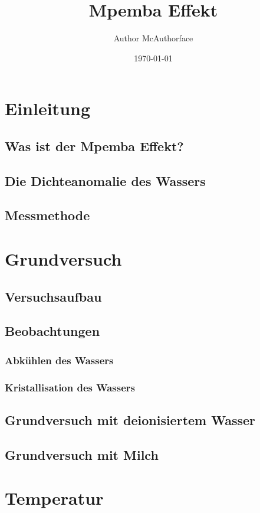 \documentclass[11pt,a4paper]{scrartcl}
\title{Mpemba Effekt}
\date{\today}
\author{Author McAuthorface}
\begin{document}
\maketitle
\thispagestyle{empty}
\newpage

\tableofcontents
\thispagestyle{empty}
\newpage

\section{Einleitung}
\subsection{Was ist der Mpemba Effekt?}
\subsection{Die Dichteanomalie des Wassers}
\subsection{Messmethode}

\section{Grundversuch}
\subsection{Versuchsaufbau}
\subsection{Beobachtungen}
\subsubsection{Abkühlen des Wassers}
\subsubsection{Kristallisation des Wassers}
\subsection{Grundversuch mit deionisiertem Wasser}
\subsection{Grundversuch mit Milch}

\section{Temperatur}
\end{document}
